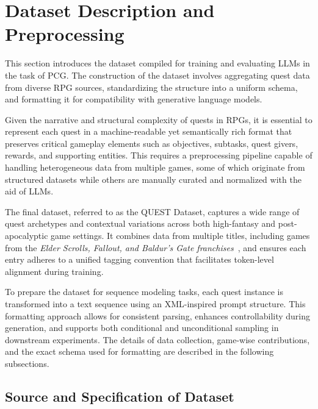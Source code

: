 \section{Dataset Description and Preprocessing}

This section introduces the dataset compiled for training and evaluating LLMs in the task
of PCG. The construction of the dataset involves aggregating quest data from diverse
RPG sources, standardizing the structure into a uniform schema, and formatting it for
compatibility with generative language models.

Given the narrative and structural complexity of quests in RPGs, it is essential to
represent each quest in a machine-readable yet semantically rich format that preserves
critical gameplay elements such as objectives, subtasks, quest givers, rewards, and supporting
entities. This requires a preprocessing pipeline capable of handling heterogeneous
data from multiple games, some of which originate from structured datasets while others
are manually curated and normalized with the aid of LLMs.

The final dataset, referred to as the QUEST Dataset, captures a wide range of quest
archetypes and contextual variations across both high-fantasy and post-apocalyptic game
settings. It combines data from multiple titles, including games from the \textit{Elder Scrolls,
Fallout, and Baldur's Gate franchises}~\cite{theelderscrollsivoblivion,theelderscrollsvskyrim,fallout1,fallout2,baldursgate,baldursgate2shadowsofamn}, and ensures each entry adheres to a unified
tagging convention that facilitates token-level alignment during training.

To prepare the dataset for sequence modeling tasks, each quest instance is transformed
into a text sequence using an XML-inspired prompt structure. This formatting approach
allows for consistent parsing, enhances controllability during generation, and supports
both conditional and unconditional sampling in downstream experiments. The details of
data collection, game-wise contributions, and the exact schema used for formatting are
described in the following subsections.

\subsection{Source and Specification of Dataset}

